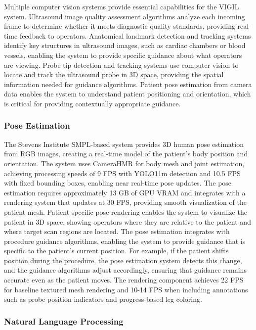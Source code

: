 \documentclass[12pt,a4paper]{article}
\begin{document}
Multiple computer vision systems provide essential capabilities for the VIGIL system. Ultrasound image quality assessment algorithms analyze each incoming frame to determine whether it meets diagnostic quality standards, providing real-time feedback to operators. Anatomical landmark detection and tracking systems identify key structures in ultrasound images, such as cardiac chambers or blood vessels, enabling the system to provide specific guidance about what operators are viewing. Probe tip detection and tracking systems use computer vision to locate and track the ultrasound probe in 3D space, providing the spatial information needed for guidance algorithms. Patient pose estimation from camera data enables the system to understand patient positioning and orientation, which is critical for providing contextually appropriate guidance.

\subsubsection{Pose Estimation}

The Stevens Institute SMPL-based system provides 3D human pose estimation from RGB images, creating a real-time model of the patient's body position and orientation. The system uses CameraHMR for body mesh and joint estimation, achieving processing speeds of 9 FPS with YOLO11m detection and 10.5 FPS with fixed bounding boxes, enabling near real-time pose updates. The pose estimation requires approximately 13 GB of GPU VRAM and integrates with a rendering system that updates at 30 FPS, providing smooth visualization of the patient mesh. Patient-specific pose rendering enables the system to visualize the patient in 3D space, showing operators where they are relative to the patient and where target scan regions are located. The pose estimation integrates with procedure guidance algorithms, enabling the system to provide guidance that is specific to the patient's current position. For example, if the patient shifts position during the procedure, the pose estimation system detects this change, and the guidance algorithms adjust accordingly, ensuring that guidance remains accurate even as the patient moves. The rendering component achieves 22 FPS for baseline textured mesh rendering and 10-14 FPS when including annotations such as probe position indicators and progress-based leg coloring.

\subsubsection{Natural Language Processing}
\end{document}
